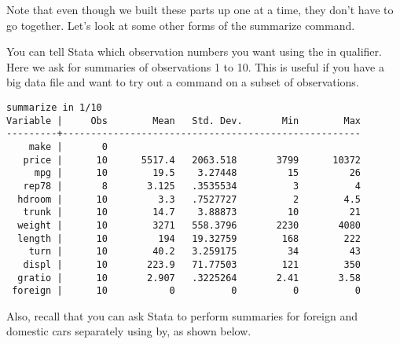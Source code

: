 Note that even though we built these parts up one at a time, they don't have to go together. Let's look at some other forms of the summarize command.

You can tell Stata which observation numbers you want using the in qualifier. Here we ask for summaries of observations 1 to 10. This is useful if you have a big data file and want to try out a command on a subset of observations.

\begin{lstlisting}
summarize in 1/10
Variable |     Obs        Mean   Std. Dev.       Min        Max
---------+-----------------------------------------------------
    make |       0
   price |      10      5517.4   2063.518       3799      10372
     mpg |      10        19.5    3.27448         15         26
   rep78 |       8       3.125   .3535534          3          4
  hdroom |      10         3.3   .7527727          2        4.5
   trunk |      10        14.7    3.88873         10         21
  weight |      10        3271   558.3796       2230       4080
  length |      10         194   19.32759        168        222
    turn |      10        40.2   3.259175         34         43
   displ |      10       223.9   71.77503        121        350
  gratio |      10       2.907   .3225264       2.41       3.58
 foreign |      10           0          0          0          0
\end{lstlisting}

Also, recall that you can ask Stata to perform summaries for foreign and domestic cars separately using by, as shown below.

